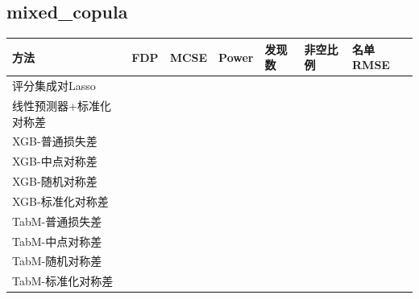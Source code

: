 \documentclass[UTF8,11pt,a4paper]{ctexart}
\begin{document}
\subsection{mixed\_copula}\label{mixed_copula}

{\def\LTcaptype{none} %
{
\footnotesize
\begin{longtable}[]{@{}
  >{\raggedright\arraybackslash}p{}
  >{\raggedright\arraybackslash}p{}
  >{\raggedright\arraybackslash}p{}
  >{\raggedright\arraybackslash}p{}
  >{\raggedright\arraybackslash}p{}
  >{\raggedright\arraybackslash}p{}
  >{\raggedright\arraybackslash}p{}@{}}
\toprule\noalign{}
\begin{minipage}[b]{\linewidth}\raggedright
方法
\end{minipage} & \begin{minipage}[b]{\linewidth}\raggedright
FDP
\end{minipage} & \begin{minipage}[b]{\linewidth}\raggedright
MCSE
\end{minipage} & \begin{minipage}[b]{\linewidth}\raggedright
Power
\end{minipage} & \begin{minipage}[b]{\linewidth}\raggedright
发现数
\end{minipage} & \begin{minipage}[b]{\linewidth}\raggedright
非空比例
\end{minipage} & \begin{minipage}[b]{\linewidth}\raggedright
名单RMSE
\end{minipage} \\
\midrule\noalign{}
\endhead
\bottomrule\noalign{}
\endlastfoot
评分集成对Lasso & 0.1177 & 0.0211 & 0.1640 & 2.78 & 0.33 & 1.1642 \\
线性预测器+标准化对称差 & 0.0903 & 0.0172 & 0.1750 & 2.56 & 0.33 & 1.1590 \\
XGB-普通损失差 & 0.1680 & 0.0147 & 0.9980 & 12.48 & 1.00 & 0.8517 \\
XGB-中点对称差 & 0.1750 & 0.0154 & 0.9940 & 12.56 & 1.00 & 0.8523 \\
XGB-随机对称差 & 0.1849 & 0.0161 & 0.9940 & 12.80 & 1.00 & 0.8526 \\
XGB-标准化对称差 & 0.1684 & 0.0169 & 0.8940 & 11.55 & 0.97 & 0.8799 \\
TabM-普通损失差 & 0.1888 & 0.0162 & 0.9810 & 12.69 & 1.00 & 0.8546 \\
TabM-中点对称差 & 0.1612 & 0.0163 & 0.9640 & 12.10 & 1.00 & 0.8572 \\
TabM-随机对称差 & 0.1518 & 0.0144 & 0.9630 & 11.78 & 1.00 & 0.8573 \\
TabM-标准化对称差 & 0.1506 & 0.0146 & 0.8030 & 10.00 & 0.97 & 0.8999 \\
\end{longtable}
}
}
\end{document}
